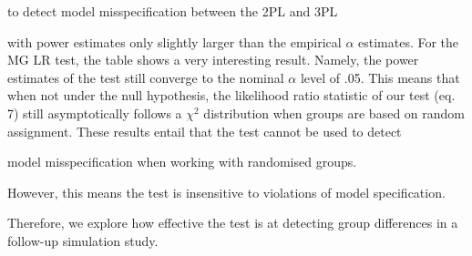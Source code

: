 \documentclass[Royal,sageapa,times,doublespace]{sagej}
\begin{document}
to detect model misspecification between the 2PL and 3PL %

with power estimates only slightly larger than the empirical $\alpha$ estimates. For the MG LR test, the table shows a very interesting result. Namely, the power estimates of the test still converge to the nominal $\alpha$ level of .05. This means that when not under the null hypothesis, the likelihood ratio statistic of our test (eq. 7) still asymptotically follows a $\chi^2$ distribution when groups are based on random assignment. These results entail that the test cannot be used to detect 

model misspecification when working with randomised groups. %

However, this means the test is insensitive to violations of model specification. %

Therefore, we explore how effective the test is at detecting group differences in a follow-up simulation study.
\end{document}
